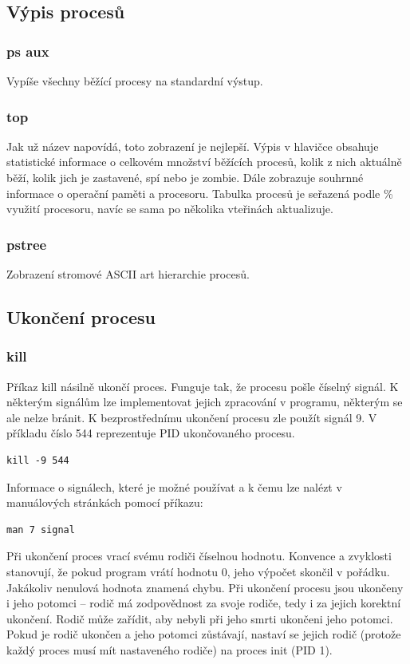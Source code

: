 \documentclass{article}
\begin{document}
\subsection{Výpis procesů}
\subsubsection{ps aux}
Vypíše všechny běžící procesy na standardní výstup. 
\subsubsection{top}
Jak už název napovídá, toto zobrazení je nejlepší. Výpis v hlavičce obsahuje statistické informace o celkovém množství běžících procesů, kolik z nich aktuálně běží, kolik jich je zastavené, spí nebo je zombie. Dále zobrazuje souhrnné informace o operační paměti a procesoru. Tabulka procesů je seřazená podle \% využití procesoru, navíc se sama po několika vteřinách aktualizuje.
\subsubsection{pstree}
Zobrazení stromové ASCII art hierarchie procesů.

\subsection{Ukončení procesu}
\subsubsection{kill}
Příkaz kill násilně ukončí proces. Funguje tak, že procesu pošle číselný signál. K některým signálům lze implementovat jejich zpracování v programu, některým se ale nelze bránit. K bezprostřednímu ukončení procesu zle použít signál 9. V příkladu číslo 544 reprezentuje PID ukončovaného procesu.
\begin{verbatim}
kill -9 544 
\end{verbatim}

Informace o signálech, které je možné používat a k čemu lze nalézt v manuálových stránkách pomocí příkazu:
\begin{verbatim}
man 7 signal
\end{verbatim}

Při ukončení proces vrací svému rodiči číselnou hodnotu. Konvence a zvyklosti stanovují, že pokud program vrátí hodnotu 0, jeho výpočet skončil v pořádku. Jakákoliv nenulová hodnota znamená chybu. Při ukončení procesu jsou ukončeny i jeho potomci -- rodič má zodpovědnost za svoje rodiče, tedy i za jejich korektní ukončení. Rodič může zařídit, aby nebyli při jeho smrti ukončeni jeho potomci. Pokud je rodič ukončen a jeho potomci zůstávají, nastaví se jejich rodič (protože každý proces musí mít nastaveného rodiče) na proces init (PID 1).
\end{document}
